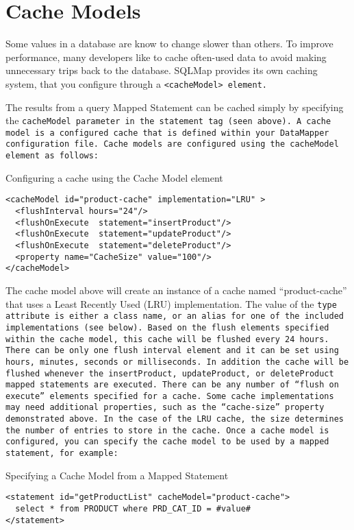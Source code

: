 \chapter{Cache Models}\label{section:3.8}
Some values in a database are know to change slower than others. To improve
performance, many developers like to cache often-used data to avoid making
unnecessary trips back to the database. SQLMap provides its own caching
system, that you configure through a \tt{<cacheModel>} element.

The results from a query Mapped Statement can be cached simply by specifying
the \tt{cacheModel} parameter in the statement tag (seen above). A cache model
is a configured cache that is defined within your DataMapper configuration
file. Cache models are configured using the \tt{cacheModel} element as
follows:

\begin{example}\label{example:3.45}
Configuring a cache using the Cache Model element
\begin{verbatim}
<cacheModel id="product-cache" implementation="LRU" >
  <flushInterval hours="24"/>
  <flushOnExecute  statement="insertProduct"/>
  <flushOnExecute  statement="updateProduct"/>
  <flushOnExecute  statement="deleteProduct"/>
  <property name="CacheSize" value="100"/>
</cacheModel>
\end{verbatim}
\end{example}

The cache model above will create an instance of a cache named
``product-cache'' that uses a Least Recently Used (LRU) implementation. The
value of the \tt{type} attribute is either a class name, or an alias for one
of the included implementations (see below). Based on the flush elements
specified within the cache model, this cache will be flushed every 24 hours.
There can be only one flush interval element and it can be set using hours,
minutes, seconds or milliseconds. In addition the cache will be flushed
whenever the \tt{insertProduct}, \tt{updateProduct}, or \tt{deleteProduct}
mapped statements are executed. There can be any number of ``flush on
execute'' elements specified for a cache. Some cache implementations may need
additional properties, such as the ``cache-size'' property demonstrated above.
In the case of the LRU cache, the size determines the number of entries to
store in the cache. Once a cache model is configured, you can specify the
cache model to be used by a mapped statement, for example:

\begin{example}\label{example:3.46}
Specifying a Cache Model from a Mapped Statement
\begin{verbatim}
<statement id="getProductList" cacheModel="product-cache">
  select * from PRODUCT where PRD_CAT_ID = #value#
</statement>
\end{verbatim}
\end{example}


